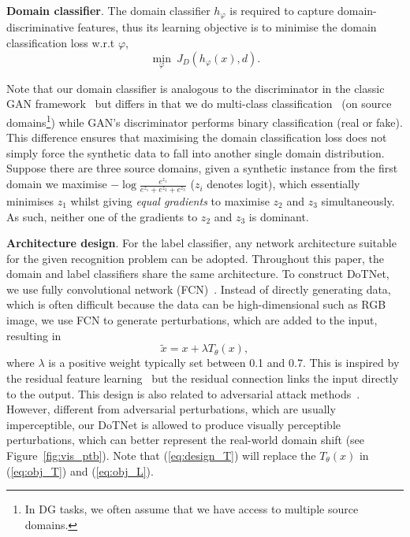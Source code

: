 \documentclass[letterpaper]{article}
\newcommand{\keypoint}[1]{\vspace{0.1cm}\noindent\textbf{#1}}
\begin{document}
\keypoint{Domain classifier}.
The domain classifier $h_\varphi$ is required to capture domain-discriminative features, thus its learning objective is to minimise the domain classification loss w.r.t $\varphi$,
\begin{equation} \label{eq:obj_D}
\min_\varphi~ J_D (h_\varphi (x), d).
\end{equation}


Note that our domain classifier is analogous to the discriminator in the classic GAN framework~\cite{goodfellow2014generative} but differs in that we do multi-class classification~\cite{odena2017conditional} (on source domains\footnote{In DG tasks, we often assume that we have access to multiple source domains.}) while GAN's discriminator performs binary classification (real or fake). This difference ensures that maximising the domain classification loss does not simply force the synthetic data to fall into another single domain distribution. Suppose there are three source domains, given a synthetic instance from the first domain we maximise $- \log \frac{ e^{z_1} }{ e^{z_1} + e^{z_2} + e^{z_3} }$ ($z_i$ denotes logit), which essentially minimises $z_1$ whilst giving \emph{equal gradients} to maximise $z_2$ and $z_3$ simultaneously. As such, neither one of the gradients to $z_2$ and $z_3$ is dominant.

\keypoint{Architecture design}.
For the label classifier, any network architecture suitable for the given recognition problem can be adopted. Throughout this paper, the domain and label classifiers share the same architecture. To construct DoTNet, we use fully convolutional network (FCN)~\cite{seg_fcn}. Instead of directly generating data, which is often difficult because the data can be high-dimensional such as RGB image, we use FCN to generate perturbations, which are added to the input, resulting in
\begin{equation} \label{eq:design_T}
\tilde{x} = x + \lambda T_\theta(x),
\end{equation}
where $\lambda$ is a positive weight typically set between 0.1 and 0.7. This is inspired by the residual feature learning~\cite{he2016deep} but the residual connection links the input directly to the output. This design is also related to adversarial attack methods~\cite{szegedy2014intriguing,goodfellow2015explaining}.
However, different from adversarial perturbations, which are usually imperceptible, our DoTNet is allowed to produce visually perceptible perturbations, which can better represent the real-world domain shift (see Figure~\ref{fig:vis_ptb}). Note that (\ref{eq:design_T}) will replace the $T_\theta(x)$ in (\ref{eq:obj_T}) and (\ref{eq:obj_L}).
\end{document}
